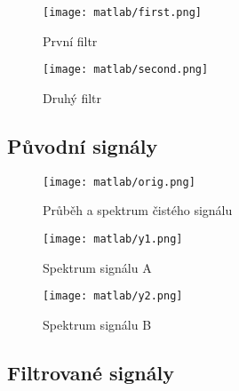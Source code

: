 \documentclass[11pt, a4paper]{article}
\begin{document}
            \begin{figure}[H]
                \centering
                \begin{minipage}{.5\textwidth}
                    \centering
                    \texttt{[image: matlab/first.png]}
                    \caption{První filtr}
                    \label{fig:freqz1}
                \end{minipage}%
                \begin{minipage}{.5\textwidth}
                    \centering
                    \texttt{[image: matlab/second.png]}
                    \caption{Druhý filtr}
                    \label{fig:freqz2}
                \end{minipage}
            \end{figure}
            
        \subsection{Původní signály}
    
            \begin{figure}[H]
                \centering
                \texttt{[image: matlab/orig.png]}
                \caption{Průběh a spektrum čistého signálu}
                \label{fig:orig}
            \end{figure}
    
            \begin{figure}[H]
                \centering
                \begin{minipage}{.5\textwidth}
                    \centering
                    \texttt{[image: matlab/y1.png]}
                    \caption{Spektrum signálu A}
                    \label{fig:y1}
                \end{minipage}%
                \begin{minipage}{.5\textwidth}
                    \centering
                    \texttt{[image: matlab/y2.png]}
                    \caption{Spektrum signálu B}
                    \label{fig:y2}
                \end{minipage}
            \end{figure}
            
        \subsection{Filtrované signály}
        
\end{document}
